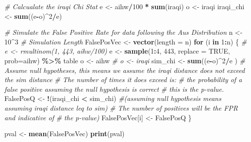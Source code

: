 \documentclass[
]{article}
\newenvironment{Shaded}{\begin{snugshade}}{\end{snugshade}}
\newcommand{\CommentTok}[1]{\textcolor[rgb]{0.56,0.35,0.01}{\textit{#1}}}
\newcommand{\ControlFlowTok}[1]{\textcolor[rgb]{0.13,0.29,0.53}{\textbf{#1}}}
\newcommand{\DataTypeTok}[1]{\textcolor[rgb]{0.13,0.29,0.53}{#1}}
\newcommand{\DecValTok}[1]{\textcolor[rgb]{0.00,0.00,0.81}{#1}}
\newcommand{\KeywordTok}[1]{\textcolor[rgb]{0.13,0.29,0.53}{\textbf{#1}}}
\newcommand{\NormalTok}[1]{#1}
\newcommand{\OperatorTok}[1]{\textcolor[rgb]{0.81,0.36,0.00}{\textbf{#1}}}
\newcommand{\OtherTok}[1]{\textcolor[rgb]{0.56,0.35,0.01}{#1}}
\newcommand{\StringTok}[1]{\textcolor[rgb]{0.31,0.60,0.02}{#1}}
\begin{document}
\begin{Shaded}
\begin{Highlighting}[]
\CommentTok{\# Calcualate the iraqi Chi Stat}
\NormalTok{e <{-}}\StringTok{ }\NormalTok{aihw}\OperatorTok{/}\DecValTok{100} \OperatorTok{*}\StringTok{ }\KeywordTok{sum}\NormalTok{(iraqi)}
\NormalTok{o <{-}}\StringTok{ }\NormalTok{iraqi}
\NormalTok{iraqi\_chi <{-}}\StringTok{ }\KeywordTok{sum}\NormalTok{((e}\OperatorTok{{-}}\NormalTok{o)}\OperatorTok{\^{}}\DecValTok{2}\OperatorTok{/}\NormalTok{e)}

\CommentTok{\# Simulate the False Positive Rate for data following the Aus Distribution}
\NormalTok{n <{-}}\StringTok{ }\DecValTok{10}\OperatorTok{\^{}}\DecValTok{3} \CommentTok{\# Simulation Length}
\NormalTok{FalsePosVec <{-}}\StringTok{ }\KeywordTok{vector}\NormalTok{(}\DataTypeTok{length =}\NormalTok{ n)}
\ControlFlowTok{for}\NormalTok{ (i }\ControlFlowTok{in} \DecValTok{1}\OperatorTok{:}\NormalTok{n) \{}
 \CommentTok{\# e <{-} rmultinom(1, 443, aihw/100)}
\NormalTok{  e <{-}}\StringTok{  }\KeywordTok{sample}\NormalTok{(}\DecValTok{1}\OperatorTok{:}\DecValTok{4}\NormalTok{, }\DecValTok{443}\NormalTok{, }\DataTypeTok{replace =} \OtherTok{TRUE}\NormalTok{, }\DataTypeTok{prob=}\NormalTok{aihw) }\OperatorTok{\%>\%}\StringTok{  }\NormalTok{table}
\NormalTok{  o <{-}}\StringTok{ }\NormalTok{aihw}
\CommentTok{\#  o <{-} iraqi}
\NormalTok{  sim\_chi <{-}}\StringTok{ }\KeywordTok{sum}\NormalTok{((e}\OperatorTok{{-}}\NormalTok{o)}\OperatorTok{\^{}}\DecValTok{2}\OperatorTok{/}\NormalTok{e )}
  \CommentTok{\# Assume null hypotheses, this means we assume the iraqi distance does not exceed the sim distance}
  \CommentTok{\# The number of times it does exceed is:}
      \CommentTok{\# the probability of a false positive assuming the null hypothesis is correct}
           \CommentTok{\# this is the p{-}value.}
\NormalTok{  FalsePosQ <{-}}\StringTok{ }\OperatorTok{!}\NormalTok{(iraqi\_chi }\OperatorTok{<}\StringTok{ }\NormalTok{sim\_chi) }\CommentTok{\#(assuming null hypothesis means assuming iraqi distance leq to  sim)}
                                     \CommentTok{\# The number of positives will be the FPR and indicative of }
                                     \CommentTok{\# the p{-}value)}
\NormalTok{  FalsePosVec[i] <{-}}\StringTok{ }\NormalTok{FalsePosQ}
\NormalTok{\}}

\NormalTok{pval <{-}}\StringTok{ }\KeywordTok{mean}\NormalTok{(FalsePosVec)}
\KeywordTok{print}\NormalTok{(pval)}
\end{Highlighting}
\end{Shaded}
\end{document}
